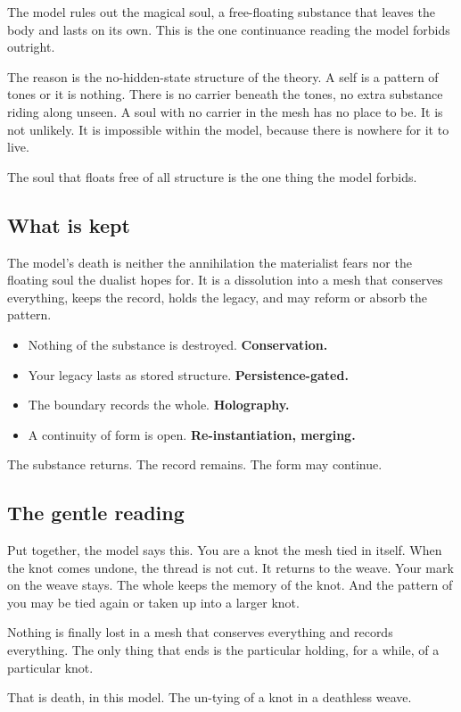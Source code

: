 The model rules out the magical soul, a free-floating substance that leaves the body and lasts on its own. This is the one continuance reading the model forbids outright.

The reason is the no-hidden-state structure of the theory. A self is a pattern of tones or it is nothing. There is no carrier beneath the tones, no extra substance riding along unseen. A soul with no carrier in the mesh has no place to be. It is not unlikely. It is impossible within the model, because there is nowhere for it to live.

\begin{principle}
The soul that floats free of all structure is the one thing the model forbids.
\end{principle}

\subsection{What is kept}

The model's death is neither the annihilation the materialist fears nor the floating soul the dualist hopes for. It is a dissolution into a mesh that conserves everything, keeps the record, holds the legacy, and may reform or absorb the pattern.

\begin{itemize}
\item Nothing of the substance is destroyed. \textbf{Conservation.}
\item Your legacy lasts as stored structure. \textbf{Persistence-gated.}
\item The boundary records the whole. \textbf{Holography.}
\item A continuity of form is open. \textbf{Re-instantiation, merging.}
\end{itemize}

The substance returns. The record remains. The form may continue.

\subsection{The gentle reading}

Put together, the model says this. You are a knot the mesh tied in itself. When the knot comes undone, the thread is not cut. It returns to the weave. Your mark on the weave stays. The whole keeps the memory of the knot. And the pattern of you may be tied again or taken up into a larger knot.

Nothing is finally lost in a mesh that conserves everything and records everything. The only thing that ends is the particular holding, for a while, of a particular knot.

\begin{principle}
That is death, in this model. The un-tying of a knot in a deathless weave.
\end{principle}
